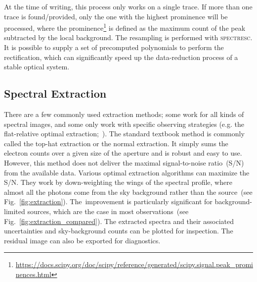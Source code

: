 \documentclass[linenumbers, twocolumn]{aastex631}
\begin{document}
At the time of writing, this process only works on a single trace. If
more than one trace is found/provided, only the one with the highest prominence
will be processed, where the 
prominence\footnote{\url{https://docs.scipy.org/doc/scipy/reference/generated/scipy.signal.peak_prominences.html}}
is defined as the maximum count of the peak subtracted by the local background. 
The resampling is performed with \textsc{spectresc}. It is possible to supply
a set of precomputed polynomials to perform the rectification, which can
significantly speed up the data-reduction process of a stable optical system.

\subsection{Spectral Extraction}
\label{sec:extract}
There are a few commonly used extraction methods; some work for all kinds of
spectral images, and some only work with specific observing strategies (e.g. the
flat-relative optimal extraction;~\citealt{2014A&A...561A..59Z}). The standard
textbook method is commonly called the top-hat extraction or the
normal extraction. It simply sums the electron counts over a given size
of the aperture and is robust and easy to use. However, this method does not
deliver the maximal signal-to-noise ratio~(S/N) from the available data. Various
optimal extraction algorithms can maximize the S/N. They work by down-weighting
the wings of the spectral profile, where almost all the photons come from the sky
background rather than the source~(see Fig.~\ref{fig:extraction}). The\
improvement is particularly significant for background-limited sources, which
are the case in most observations~(see Fig.~\ref{fig:extraction_compared}).
The extracted spectra and their associated uncertainties and sky-background
counts can be plotted for inspection. The residual image can also be exported
for diagnostics.
\end{document}
